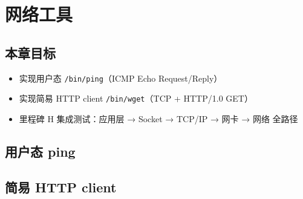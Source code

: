 \chapter{网络工具}
\label{ch:net-tools}

\section{本章目标}

\begin{itemize}
  \item 实现用户态 \texttt{/bin/ping}（ICMP Echo Request/Reply）
  \item 实现简易 HTTP client \texttt{/bin/wget}（TCP + HTTP/1.0 GET）
  \item 里程碑 H 集成测试：应用层 → Socket → TCP/IP → 网卡 → 网络 全路径
\end{itemize}

\section{用户态 ping}
\label{sec:nettools-ping}


\section{简易 HTTP client}
\label{sec:nettools-wget}


